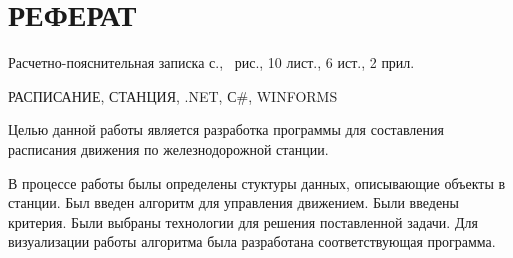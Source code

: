 \section*{\centering РЕФЕРАТ}
\setcounter{page}{2}

Расчетно-пояснительная записка \pageref{LastPage} с., \totalfigures\ рис., 10 лист., 6 ист., 2 прил.

РАСПИСАНИЕ, СТАНЦИЯ, .NET, С\#, WINFORMS

Целью данной работы является разработка программы для составления расписания движения по железнодорожной станции.

В процессе работы былы определены стуктуры данных, описывающие объекты в станции.
Был введен алгоритм для управления движением.
Были введены критерия.
Были выбраны технологии для решения поставленной задачи.
Для визуализации работы алгоритма была разработана соответствующая программа.

